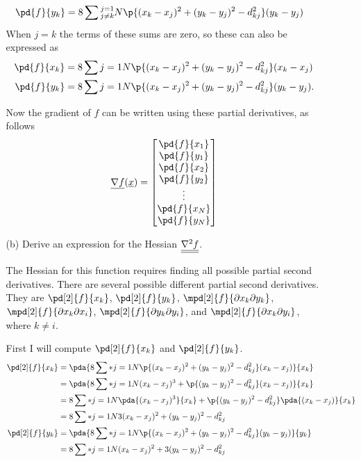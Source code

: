 \documentclass[11pt, oneside]{article}
\begin{document}
\begin{enumerate}
\begin{enumerate}
\begin{align*}
          \pd{f}{y_k} &= 8 \sum{\substack{j = 1 \\ j \neq k}}{N}{\p{(x_k - x_j)^2 + (y_k - y_j)^2 - d_{kj}^2}(y_k - y_j)}
        \end{align*}
        When $j = k$ the terms of these sums are zero, so these can also be expressed as
        \begin{align*}
          \pd{f}{x_k} &= 8 \sum{j = 1}{N}{\p{(x_k - x_j)^2 + (y_k - y_j)^2 - d_{kj}^2}(x_k - x_j)} \\
          \pd{f}{y_k} &= 8 \sum{j = 1}{N}{\p{(x_k - x_j)^2 + (y_k - y_j)^2 - d_{kj}^2}(y_k - y_j)}.
        \end{align*}

        Now the gradient of $f$ can be written using these partial derivatives, as follows
        \[
          \v{\nabla f}(\v{x}) =
          \begin{bmatrix}
            \pd{f}{x_1} \\
            \pd{f}{y_1} \\
            \pd{f}{x_2} \\
            \pd{f}{y_2} \\
            \vdots \\
            \pd{f}{x_N} \\
            \pd{f}{y_N} \\
          \end{bmatrix}
        \]

      \item[(b)] %
        Derive an expression for the Hessian $\underline{\underline{\nabla^2 f}}$.

        The Hessian for this function requires finding all possible partial
        second derivatives.
        There are several possible different partial second derivatives.
        They are $\pd[2]{f}{x_k}$, $\pd[2]{f}{y_k}$,
        $\mpd[2]{f}{\partial x_k \partial y_k}$,
        $\mpd[2]{f}{\partial x_k \partial x_i}$,
        $\mpd[2]{f}{\partial y_k \partial y_i}$, and 
        $\mpd[2]{f}{\partial x_k \partial y_i}$, where $k \neq i$.

        First I will compute $\pd[2]{f}{x_k}$ and $\pd[2]{f}{y_k}$.
        \begin{align*}
          \pd[2]{f}{x_k} &= \pda{8 \sum*{j = 1}{N}{\p{(x_k - x_j)^2 + (y_k - y_j)^2 - d_{kj}^2}(x_k - x_j)}}{x_k} \\
          &= \pda{8 \sum*{j = 1}{N}{(x_k - x_j)^3 + \p{(y_k - y_j)^2 - d_{kj}^2}(x_k - x_j)}}{x_k} \\
          &= 8 \sum*{j = 1}{N}{\pda{(x_k - x_j)^3}{x_k} + \p{(y_k - y_j)^2 - d_{kj}^2}\pda{(x_k - x_j)}{x_k}} \\
          &= 8 \sum*{j = 1}{N}{3(x_k - x_j)^2 + (y_k - y_j)^2 - d_{kj}^2} \\
          \pd[2]{f}{y_k} &= \pda{8 \sum*{j = 1}{N}{\p{(x_k - x_j)^2 + (y_k - y_j)^2 - d_{kj}^2}(y_k - y_j)}}{y_k} \\
          &= 8 \sum*{j = 1}{N}{(x_k - x_j)^2 + 3(y_k - y_j)^2 - d_{kj}^2} \\
        \end{align*}


\end{enumerate}
\end{enumerate}
\end{document}
